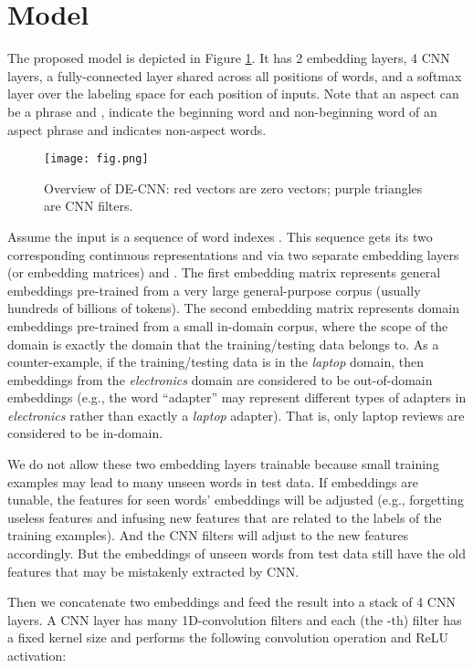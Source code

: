 \documentclass[11pt,a4paper]{article}
\begin{document}
\section{Model}
\label{sec:model}

The proposed model is depicted in Figure \ref{fig:fr}.
It has 2 embedding layers, 4 CNN layers, a fully-connected layer shared across all positions of words, and a softmax layer over the labeling space  for each position of inputs.
Note that an aspect can be a phrase and ,  indicate the beginning word and non-beginning word of an aspect phrase and  indicates non-aspect words.

\begin{figure}[t]
\centering    
\texttt{[image: fig.png]}
    \caption{Overview of DE-CNN: red vectors are zero vectors; purple triangles are CNN filters. }
    \label{fig:fr}
\end{figure}

Assume the input is a sequence of word indexes .
This sequence gets its two corresponding continuous representations  and  via two separate embedding layers (or embedding matrices)  and .
The first embedding matrix  represents general embeddings pre-trained from a very large general-purpose corpus (usually hundreds of billions of tokens).
The second embedding matrix  represents domain embeddings pre-trained from a small in-domain corpus, where the scope of the domain is exactly the domain that the training/testing data belongs to.
As a counter-example, if the training/testing data is in the \textit{laptop} domain, then embeddings from the \textit{electronics} domain are considered to be out-of-domain embeddings (e.g., the word ``adapter'' may represent different types of adapters in \textit{electronics} rather than exactly a \textit{laptop} adapter). That is, only laptop reviews are considered to be in-domain. 

We do not allow these two embedding layers trainable because small training examples may lead to many unseen words in test data.
If embeddings are tunable, the features for seen words' embeddings will be adjusted (e.g., forgetting useless features and infusing new features that are related to the labels of the training examples).
And the CNN filters will adjust to the new features accordingly. 
But the embeddings of unseen words from test data still have the old features that may be mistakenly extracted by CNN.

Then we concatenate two embeddings  and feed the result into a stack of 4 CNN layers. A CNN layer has many 1D-convolution filters and each (the -th) filter has a fixed kernel size  and performs the following convolution operation and ReLU activation: 
\end{document}
